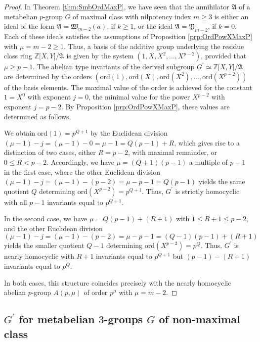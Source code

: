 \documentclass{amsart}
\theoremstyle{definition}
\numberwithin{equation}{section}
\begin{document}
\begin{proof}
In Theorem
\ref{thm:SmbOrdMaxP},
we have seen that the annihilator \(\mathfrak{A}\) of a
metabelian \(p\)-group \(G\) of maximal class with nilpotency index \(m\ge 3\)
is either an ideal of the form \(\mathfrak{A}=\mathfrak{W}_{m-2}(a)\), if \(k\ge 1\),
or the ideal \(\mathfrak{A}=\mathfrak{Y}_{m-2}\), if \(k=0\).
Each of these ideals satisfies the assumptions of Proposition
\ref{prp:OrdPowXMaxP}
with \(\mu=m-2\ge 1\).
Thus, a basis of the additive group underlying the residue class ring \(\mathbb{Z}\lbrack X,Y\rbrack/\mathfrak{A}\)
is given by the system \(\left(1,X,X^2,\ldots,X^{p-2}\right)\), provided that \(\mu\ge p-1\).
The abelian type invariants of the derived subgroup
\(G^\prime\simeq\mathbb{Z}\lbrack X,Y\rbrack/\mathfrak{A}\)
are determined by the orders
\(\left(\mathrm{ord}(1),\mathrm{ord}(X),\mathrm{ord}(X^2),\ldots,\mathrm{ord}(X^{p-2})\right)\)
of the basis elements.
The maximal value of the order is achieved for the constant \(1=X^0\) with exponent \(j=0\),
the minimal value for the power \(X^{p-2}\) with exponent \(j=p-2\).
By Proposition
\ref{prp:OrdPowXMaxP},
these values are determined as follows.

We obtain \(\mathrm{ord}(1)=p^{Q+1}\) by the Euclidean division \((\mu-1)-j=(\mu-1)-0=\mu-1=Q(p-1)+R\),
which gives rise to a distinction of two cases, either \(R=p-2\), with maximal remainder, or \(0\le R<p-2\).
Accordingly, we have \(\mu=(Q+1)(p-1)\) a multiple of \(p-1\) in the first case,
where the other Euclidean division \((\mu-1)-j=(\mu-1)-(p-2)=\mu-p-1=Q(p-1)\)
yields the same quotient \(Q\) determining \(\mathrm{ord}(X^{p-2})=p^{Q+1}\).
Thus, \(G^\prime\) is strictly homocyclic with all \(p-1\) invariants equal to \(p^{Q+1}\).

In the second case, we have \(\mu=Q(p-1)+(R+1)\) with \(1\le R+1\le p-2\),
and the other Euclidean division \((\mu-1)-j=(\mu-1)-(p-2)=\mu-p-1=(Q-1)(p-1)+(R+1)\)
yields the smaller quotient \(Q-1\) determining \(\mathrm{ord}(X^{p-2})=p^{Q}\).
Thus, \(G^\prime\) is nearly homocyclic with \(R+1\) invariants equal to \(p^{Q+1}\)
but \((p-1)-(R+1)\) invariants equal to \(p^{Q}\).

In both cases, this structure coincides precisely with the nearly homocyclic abelian \(p\)-group
\(A(p,\mu)\) of order \(p^\mu\) with \(\mu=m-2\).
\end{proof}



\subsection{\(G^\prime\) for metabelian \(3\)-groups \(G\) of non-maximal class}
\label{ss:ComSbgLow}
\end{document}
